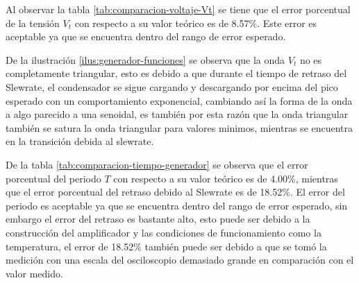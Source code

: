 Al observar la tabla \ref{tab:comparacion-voltaje-Vt} se tiene que el error porcentual de la tensión $V_t$ con respecto a su valor teórico es de 8.57\%. Este error es aceptable ya que se encuentra dentro del rango de error esperado.

De la ilustración \ref{ilus:generador-funciones} se observa que la onda $V_t$ no es completamente triangular, esto es debido a que durante el tiempo de retraso del Slewrate, el condensador se sigue cargando y descargando por encima del pico esperado con un comportamiento exponencial, cambiando así la forma de la onda a algo parecido a una senoidal, es también por esta razón que la onda triangular también se satura la onda triangular para valores minimos, mientras se encuentra en la transición debida al slewrate.

De la tabla \ref{tab:comparacion-tiempo-generador} se observa que el error porcentual del periodo $T$ con respecto a su valor teórico es de 4.00\%, mientras que el error porcentual del retraso debido al Slewrate es de 18.52\%. El error del periodo es aceptable ya que se encuentra dentro del rango de error esperado, sin embargo el error del retraso es bastante alto, esto puede ser debido a la construcción del amplificador y las condiciones de funcionamiento como la temperatura, el error de 18.52\% también puede ser debido a que se tomó la medición con una escala del osciloscopio demasiado grande en comparación con el valor medido.
